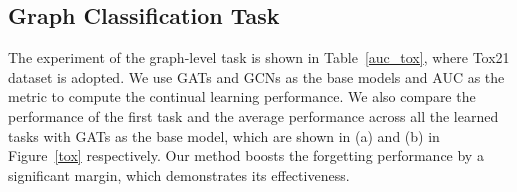 \documentclass[letterpaper]{article} %
\begin{document}
\subsection{Graph Classification Task}
The experiment of the graph-level task is shown in 
Table~\ref{auc_tox}, where Tox21 dataset is adopted. 
We use GATs and GCNs as the base models and
AUC as the metric to compute the continual learning
performance.
We also compare the performance of the first task and
the average performance across all the learned tasks
with GATs as the base model, which are
shown in (a) and (b) in Figure~\ref{tox} respectively.
Our method boosts the forgetting performance
by a significant margin, which demonstrates its effectiveness.

\begin{table}[!h]
\vspace{-0.3em}
\caption{Performance comparison on the Tox21 dataset.
}
\vspace{-0.4em}
\centering
{}
\vspace{-1.0em}
\label{auc_tox}
\end{table}
\end{document}
